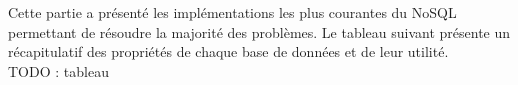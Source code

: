 Cette partie a présenté les implémentations les plus courantes du NoSQL permettant de résoudre la majorité des problèmes. Le tableau suivant présente un récapitulatif des propriétés de chaque base de données et de leur utilité.\\

TODO : tableau
